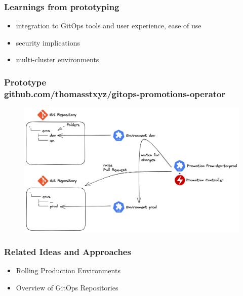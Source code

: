 \documentclass{beamer}
\begin{document}
\begin{frame}
	\frametitle{Learnings from prototyping}
	
	\begin{itemize}
		\item integration to GitOps tools and user experience, ease of use
		\item security implications
		\item multi-cluster environments
	\end{itemize}
	
\end{frame}

\begin{frame}
	\frametitle{Prototype \\ github.com/thomasstxyz/gitops-promotions-operator}
	
	\begin{figure}[h]
		\centering
		\includegraphics[width=1.0\linewidth]{assets/architecture-controller-crd.png}
		\label{fig:architecture-controller-crd}	
	\end{figure}
	
\end{frame}
%	
%	

\begin{frame}
\frametitle{Related Ideas and Approaches}

\begin{itemize}
	\item Rolling Production Environments
	\item Overview of GitOps Repositories
\end{itemize}

\end{frame}
\end{document}
